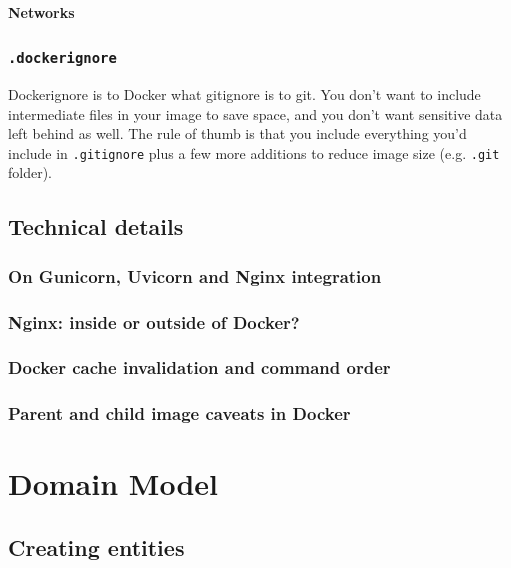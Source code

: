 \documentclass{article}
\begin{document}
\paragraph{Networks}

\subsubsection{\texttt{.dockerignore}}

Dockerignore is to Docker what gitignore is to git. You don't want to include intermediate files in your image to save space, and you don't want sensitive data left behind as well. The rule of thumb is that you include everything you'd include in \texttt{.gitignore} plus a few more additions to reduce image size (e.g. \texttt{.git} folder).

\subsection{Technical details}

\subsubsection{On Gunicorn, Uvicorn and Nginx integration}

\subsubsection{Nginx: inside or outside of Docker?}

\subsubsection{Docker cache invalidation and command order}

\subsubsection{Parent and child image caveats in Docker}

\section{Domain Model}

\subsection{Creating entities}
\end{document}
